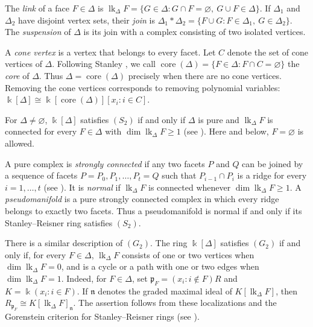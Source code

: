 \documentclass[a4paper,11pt]{amsart}
\theoremstyle{plain}
\theoremstyle{definition}
\theoremstyle{remark}
\DeclareMathOperator{\core}{core}
\newcommand{\kk}{\Bbbk}
\begin{document}
The \emph{link} of a face $F\in\Delta$ is $\operatorname{lk}_\Delta F=\{G\in\Delta:G\cap F=\varnothing,\ G\cup F\in\Delta\}$. If $\Delta_1$ and $\Delta_2$ have disjoint vertex sets, their \emph{join} is $\Delta_1*\Delta_2=\{F\cup G:F\in\Delta_1,\ G\in\Delta_2\}$. The \emph{suspension} of $\Delta$ is its join with a complex consisting of two isolated vertices.

A \emph{cone vertex} is a vertex that belongs to every facet. Let $C$ denote the set of cone vertices of $\Delta$. Following Stanley \cite[pp.~64--65]{Sta96}, we call $\core(\Delta)=\{F\in\Delta:F\cap C=\varnothing\}$ the \emph{core} of $\Delta$. Thus $\Delta=\core(\Delta)$ precisely when there are no cone vertices. Removing the cone vertices corresponds to removing polynomial variables: $\kk[\Delta]\cong\kk[\core(\Delta)][x_i:i\in C]$.

For $\Delta\ne\varnothing$, $\kk[\Delta]$ satisfies $(S_2)$ if and only if $\Delta$ is pure and $\operatorname{lk}_\Delta F$ is connected for every $F\in\Delta$ with $\dim\operatorname{lk}_\Delta F\geq1$ (see \cite[Section~1]{MT09}). Here and below, $F=\varnothing$ is allowed.

A pure complex is \emph{strongly connected} if any two facets $P$ and $Q$ can be joined by a sequence of facets $P=P_0,P_1,\ldots,P_t=Q$ such that $P_{i-1}\cap P_i$ is a ridge for every $i=1,\ldots,t$ (see \cite[11.6]{Bjo95}). It is \emph{normal} if $\operatorname{lk}_\Delta F$ is connected whenever $\dim\operatorname{lk}_\Delta F\geq1$. A \emph{pseudomanifold} is a pure strongly connected complex in which every ridge belongs to exactly two facets. Thus a pseudomanifold is normal if and only if its Stanley--Reisner ring satisfies $(S_2)$.

There is a similar description of $(G_2)$. The ring $\kk[\Delta]$ satisfies $(G_2)$ if and only if, for every $F\in\Delta$, $\operatorname{lk}_\Delta F$ consists of one or two vertices when $\dim\operatorname{lk}_\Delta F=0$, and is a cycle or a path with one or two edges when $\dim\operatorname{lk}_\Delta F=1$. Indeed, for $F\in\Delta$, set $\mathfrak p_F=(x_i:i\notin F)R$ and $K=\kk(x_i:i\in F)$. If $\mathfrak n$ denotes the graded maximal ideal of $K[\operatorname{lk}_\Delta F]$, then $R_{\mathfrak p_F}\cong K[\operatorname{lk}_\Delta F]_{\mathfrak n}$. The assertion follows from these localizations and the Gorenstein criterion for Stanley--Reisner rings (see \cite[Theorem~5.6.1]{BH98}).
\end{document}
